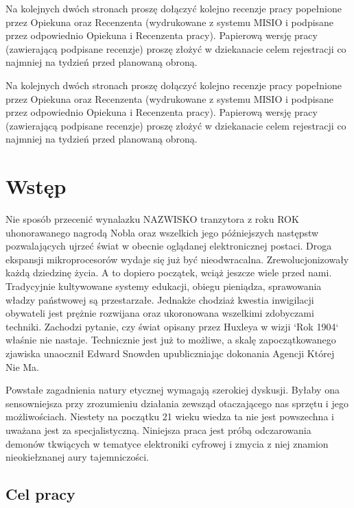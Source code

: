 \documentclass[a4paper,12pt]{article}
\begin{document}
\newpage
\noindent
Na kolejnych dwóch stronach proszę dołączyć kolejno recenzje pracy popełnione przez Opiekuna oraz Recenzenta (wydrukowane z systemu MISIO i podpisane przez odpowiednio Opiekuna i Recenzenta pracy). Papierową wersję pracy (zawierającą podpisane recenzje) proszę złożyć w dziekanacie celem rejestracji co najmniej na tydzień przed planowaną obroną.

\newpage
\noindent
Na kolejnych dwóch stronach proszę dołączyć kolejno recenzje pracy popełnione przez Opiekuna oraz Recenzenta (wydrukowane z systemu MISIO i podpisane przez odpowiednio Opiekuna i Recenzenta pracy). Papierową wersję pracy (zawierającą podpisane recenzje) proszę złożyć w dziekanacie celem rejestracji co najmniej na tydzień przed planowaną obroną.


\vspace{85mm}
\newpage
\tableofcontents

\newpage
\section{Wstęp}

Nie sposób przecenić wynalazku NAZWISKO tranzytora z roku ROK uhonorawanego nagrodą Nobla oraz wszelkich jego późniejszych następstw pozwalających ujrzeć świat w obecnie oglądanej elektronicznej postaci. Droga ekspansji mikroprocesorów wydaje się już być nieodwracalna. Zrewolucjonizowały każdą dziedzinę życia. A to dopiero początek, wciąż jeszcze wiele przed nami. Tradycyjnie kultywowane systemy edukacji, obiegu pieniądza, sprawowania władzy państwowej są przestarzałe. Jednakże chodziaż kwestia inwigilacji obywateli jest prężnie rozwijana oraz ukoronowana wszelkimi zdobyczami techniki. Zachodzi pytanie, czy świat opisany przez Huxleya w wizji `Rok 1904` właśnie nie nastaje. Technicznie jest już to możliwe, a skalę zapoczątkowanego zjawiska unaocznił Edward Snowden upubliczniając dokonania Agencji Której Nie Ma.

Powstałe zagadnienia natury etycznej wymagają szerokiej dyskusji. Byłaby ona sensowniejsza przy zrozumieniu działania zewsząd otaczającego nas sprzętu i jego możliwościach. Niestety na początku 21 wieku wiedza ta nie jest powszechna i uważana jest za specjalistyczną. Niniejsza praca jest próbą odczarowania demonów tkwiących w tematyce elektroniki cyfrowej i zmycia z niej znamion nieokiełznanej aury tajemniczości.

\subsection{Cel pracy}
\end{document}
